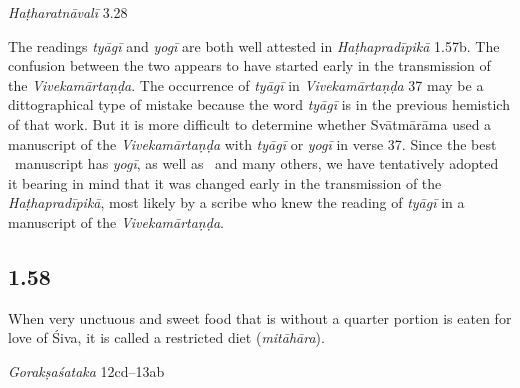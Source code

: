 \begin{ekdosis}
\begin{testimonia}[hp01_057]
\emph{Haṭharatnāvalī}  3.28

\begin{versinnote}
\tl{\var{tyāgī ] yogī P,T,t1}\\!}
\end{versinnote}

\end{testimonia}

\begin{philcomm}[hp01_057]
The readings \emph{tyāgī} and \emph{yogī} are both well attested in \emph{Haṭhapradīpikā} 1.57b. The confusion between the two appears to have started early in the transmission of the \emph{Vivekamārtaṇḍa}. The occurrence of \emph{tyāgī} in \emph{Vivekamārtaṇḍa} 37 may be a dittographical type of mistake because the word \emph{tyāgī} is in the previous hemistich of that work. But it is more difficult to determine whether Svātmārāma used a manuscript of the \emph{Vivekamārtaṇḍa} with \emph{tyāgī} or \emph{yogī} in verse 37. Since the best \textalpha\ manuscript has \emph{yogī}, as well as \etaOne\ and many others, we have tentatively adopted it bearing in mind that it was changed early in the transmission of the \emph{Haṭhapradīpikā}, most likely by a scribe who knew the reading of \emph{tyāgī} in a manuscript of the \emph{Vivekamārtaṇḍa}. 
\end{philcomm}

\subsection*{1.58}
\begin{translation}[hp01_058]
When very unctuous and sweet food that is without a quarter portion is eaten for love of Śiva, it is called a restricted diet (\emph{mitāhāra}).
\end{translation}

\begin{sources}[hp01_058]
\emph{Gorakṣaśataka} 12cd–13ab

\begin{versinnote}
\end{versinnote}

\end{sources}


\end{ekdosis}
